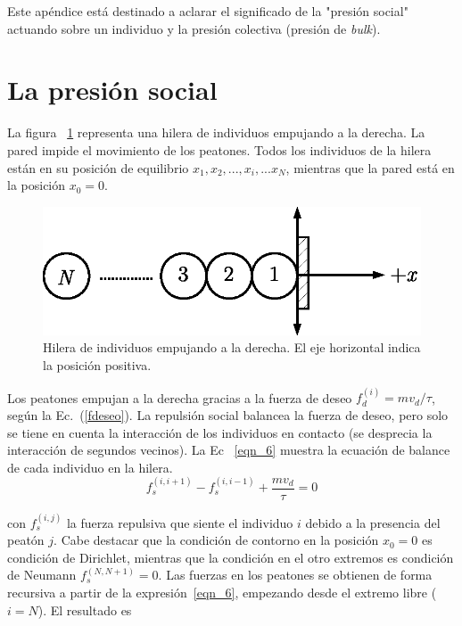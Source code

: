 \label{appendix:presion}

Este apéndice está destinado a aclarar el significado de la "presión social" actuando sobre un individuo y la presión colectiva (presión de \textit{bulk}).  
\\
\section{\label{social_pressure}La presión social}

La figura ~\ref{hilera2} representa una hilera de individuos empujando a la derecha. La pared impide el movimiento de los peatones. Todos los individuos de la hilera están en su posición de equilibrio $x_1,x_2,...,x_{i},...x_N$, mientras que la pared está en la posición $x_0=0$. 

\begin{figure}[!htbp]
\center
\includegraphics[scale=1]{figuras/hilera.eps}
\caption{\label{hilera2} Hilera de individuos empujando a la derecha. El eje horizontal indica la posición positiva. }
\end{figure}

Los peatones empujan a la derecha gracias a la fuerza de deseo
$f_d^{(i)}=mv_d/\tau$, según la Ec.~(\ref{fdeseo}). La repulsión social balancea la fuerza de deseo, pero solo se tiene en cuenta la interacción de los individuos en contacto (se desprecia la interacción de segundos vecinos). La Ec ~\ref{eqn_6} muestra la ecuación de balance de cada individuo en la hilera. \\

\begin{equation}
 f_s^{(i,i+1)}-f_s^{(i,i-1)}+\displaystyle\frac{mv_d}{\tau}=0\label{eqn_6}
\end{equation}

\noindent con $f_s^{(i,j)}$ la fuerza repulsiva que siente el individuo $i$ debido a la presencia del peatón $j$. Cabe destacar que la condición de contorno en la posición $x_0=0$  es condición de Dirichlet, mientras que la condición en el otro extremos es condición de Neumann $f_s^{(N,N+1)}=0$. Las fuerzas en los peatones se obtienen de forma recursiva a partir de la expresión~\ref{eqn_6}, empezando desde el extremo libre ($i=N$). El resultado es

